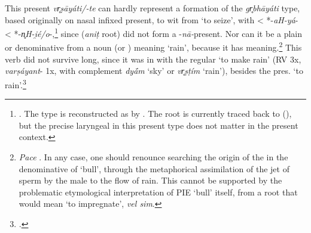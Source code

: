 \documentclass[output=paper,colorlinks,citecolor=brown]{langscibook}
\begin{document}
This present \textit{vr̥ṣāyáti/-te}  can hardly represent a formation of the \textit{gr̥bhāyáti} type, based originally on nasal infixed present, to wit  from  ‘to seize’, with  < *-\textit{aH-yá}- < *-\textit{n̥H-i̯é/o}-,\footnote{\citealt[107]{Goto2013}.  The type is reconstructed as  by \citet[123--124]{Jasanoff2003}. The root  is currently traced back to  (), but the precise laryngeal in this present type does not matter in the present context.}  since  (\textit{aniṭ} root) did not form a -\textit{nā-}present.  Nor can it be a plain  or  denominative  from a noun  (or ) meaning ‘rain’, because it has  meaning.\footnote{\textit{Pace} \citealt[131]{Goto2013}. In any case, one should renounce searching the origin of the  in the denominative  of ‘bull’, through the metaphorical assimilation of the jet of sperm by the male to the flow of rain. This cannot be supported by the problematic etymological interpretation of PIE ‘bull’ itself, from a root that would mean ‘to impregnate’, \textit{vel sim}.}  This verb did not survive long, since it was in  with the regular    ‘to make rain’ (RV 3x,  \textit{varṣáyant}- 1x, with complement \textit{dyā́m} ‘sky’ or \textit{vr̥ṣṭím} ‘rain’), besides the  pres.  ‘to rain’.\footnote{\citealt[117--118]{Jamison1983}.} 
\end{document}
